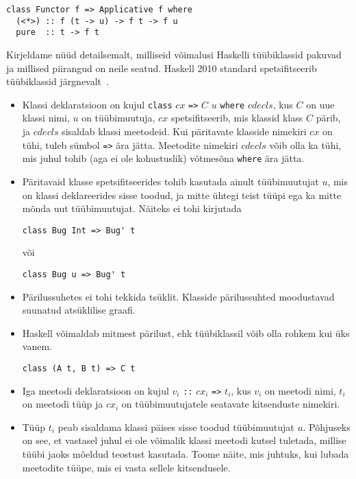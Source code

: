 \documentclass[12pt]{article}
\begin{document}
      \begin{verbatim}class Functor f => Applicative f where
  (<*>) :: f (t -> u) -> f t -> f u
  pure  :: t -> f t\end{verbatim}

      Kirjeldame nüüd detailsemalt, milliseid võimalusi Haskelli tüübiklassid pakuvad ja millised piirangud on neile seatud. Haskell 2010 standard spetsifitseerib tüübiklassid järgnevalt~\cite{Has}.
      \begin{itemize}
        \item
          Klassi deklaratsioon on kujul \verb!class! $cx$ \verb!=>! $C$ $u$ \verb!where! $cdecls$, kus $C$ on uue klassi nimi, $u$ on tüübimuutuja, $cx$ spetsifitseerib, mis klassid klass $C$ pärib, ja $cdecls$ sisaldab klassi meetodeid. Kui päritavate klasside nimekiri $cx$ on tühi, tuleb sümbol \verb!=>! ära jätta. Meetodite nimekiri $cdecls$ võib olla ka tühi, mis juhul tohib (aga ei ole kohustuslik) võtmesõna \verb!where! ära jätta.
        \item
          Päritavaid klasse spetsifitseerides tohib kasutada ainult tüübimuutujat $u$, mis on klassi deklareerides sisse toodud, ja mitte ühtegi teist tüüpi ega ka mitte mõnda uut tüübimuutujat. Näiteks ei tohi kirjutada

          \begin{verbatim}class Bug Int => Bug' t\end{verbatim}

          või

          \begin{verbatim}class Bug u => Bug' t\end{verbatim}
        \item
          Pärilussuhetes ei tohi tekkida tsüklit. Klasside pärilussuhted moodustavad suunatud atsüklilise graafi.
        \item
          Haskell võimaldab mitmest pärilust, ehk tüübiklassil võib olla rohkem kui üks vanem.

          \begin{verbatim}class (A t, B t) => C t\end{verbatim}
        \item
          Iga meetodi deklaratsioon on kujul $v_i$ \verb!::! $cx_i$ \verb!=>! $t_i$, kus $v_i$ on meetodi nimi, $t_i$ on meetodi tüüp ja $cx_i$ on tüübimuutujatele seatavate kitsenduste nimekiri.
        \item
          Tüüp $t_i$ peab sisaldama klassi päises sisse toodud tüübimuutujat $u$. Põhjuseks on see, et vastasel juhul ei ole võimalik klassi meetodi kutsel tuletada, millise tüübi jaoks mõeldud teostust kasutada. Toome näite, mis juhtuks, kui lubada meetodite tüüpe, mis ei vasta sellele kitsendusele.


\end{itemize}
\end{document}
